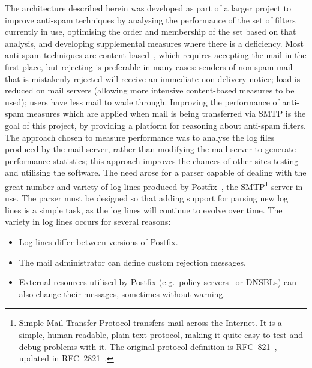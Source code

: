 \documentclass[draft]{svmult}
\begin{document}
The architecture described herein was developed as part of a larger project
to improve anti-spam techniques by analysing the performance of the set of
filters currently in use, optimising the order and membership of the set
based on that analysis, and developing supplemental measures where there is
a deficiency.  Most anti-spam techniques are
content-based~\cite{a-plan-for-spam, word-stemming, relaxed-online-svms},
which requires accepting the mail in the first place, but rejecting is
preferable in many cases: senders of non-spam mail that is mistakenly
rejected will receive an immediate non-delivery notice; load is reduced on
mail servers (allowing more intensive content-based measures to be used);
users have less mail to wade through.  Improving the performance of
anti-spam measures which are applied when mail is being transferred via
SMTP is the goal of this project, by providing a
platform for reasoning about anti-spam filters.  The approach chosen to
measure performance was to analyse the log files produced by the mail
server, rather than modifying the mail server to generate performance
statistics; this approach improves the chances of other sites testing and
utilising the software.  The need arose for a parser capable of dealing
with the great number and variety of log lines produced by
Postfix~\cite{postfix}, the SMTP\footnote{\label{smtp footnote}Simple Mail
Transfer Protocol transfers mail across the Internet.  It is a simple,
human readable, plain text protocol, making it quite easy to test and debug
problems with it.  The original protocol definition is
RFC~821~\cite{RFC821}, updated in RFC~2821~\cite{RFC2821}.} server in use.
The parser must be designed so that adding support for parsing new log
lines is a simple task, as the log lines will continue to evolve over time.
The variety in log lines occurs for several reasons:

\begin{itemize}

    \item Log lines differ between versions of Postfix.
        
    \item The mail administrator can define custom rejection
        messages.

    \item External resources utilised by Postfix (e.g.\ policy
        servers~\cite{policy-servers} or DNSBLs) can also change their
        messages, sometimes without warning.

\end{itemize}
\end{document}
